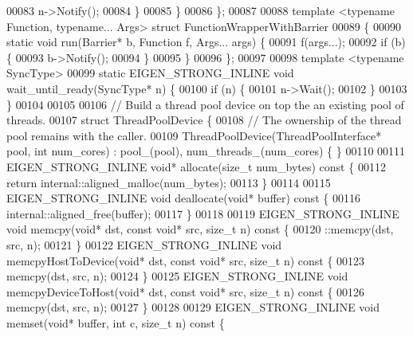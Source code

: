 \begin{DoxyCode}
00083       n->Notify();
00084     \}
00085   \}
00086 \};
00087 
00088 \textcolor{keyword}{template} <\textcolor{keyword}{typename} Function, \textcolor{keyword}{typename}... Args> \textcolor{keyword}{struct }FunctionWrapperWithBarrier
00089 \{
00090   \textcolor{keyword}{static} \textcolor{keywordtype}{void} run(Barrier* b, Function f, Args... args) \{
00091     f(args...);
00092     \textcolor{keywordflow}{if} (b) \{
00093       b->Notify();
00094     \}
00095   \}
00096 \};
00097 
00098 \textcolor{keyword}{template} <\textcolor{keyword}{typename} SyncType>
00099 \textcolor{keyword}{static} EIGEN\_STRONG\_INLINE \textcolor{keywordtype}{void} wait\_until\_ready(SyncType* n) \{
00100   \textcolor{keywordflow}{if} (n) \{
00101     n->Wait();
00102   \}
00103 \}
00104 
00105 
00106 \textcolor{comment}{// Build a thread pool device on top the an existing pool of threads.}
00107 \textcolor{keyword}{struct }ThreadPoolDevice \{
00108   \textcolor{comment}{// The ownership of the thread pool remains with the caller.}
00109   ThreadPoolDevice(ThreadPoolInterface* pool, \textcolor{keywordtype}{int} num\_cores) : pool\_(pool), num\_threads\_(num\_cores) \{ \}
00110 
00111   EIGEN\_STRONG\_INLINE \textcolor{keywordtype}{void}* allocate(\textcolor{keywordtype}{size\_t} num\_bytes)\textcolor{keyword}{ const }\{
00112     \textcolor{keywordflow}{return} internal::aligned\_malloc(num\_bytes);
00113   \}
00114 
00115   EIGEN\_STRONG\_INLINE \textcolor{keywordtype}{void} deallocate(\textcolor{keywordtype}{void}* buffer)\textcolor{keyword}{ const }\{
00116     internal::aligned\_free(buffer);
00117   \}
00118 
00119   EIGEN\_STRONG\_INLINE \textcolor{keywordtype}{void} memcpy(\textcolor{keywordtype}{void}* dst, \textcolor{keyword}{const} \textcolor{keywordtype}{void}* src, \textcolor{keywordtype}{size\_t} n)\textcolor{keyword}{ const }\{
00120     ::memcpy(dst, src, n);
00121   \}
00122   EIGEN\_STRONG\_INLINE \textcolor{keywordtype}{void} memcpyHostToDevice(\textcolor{keywordtype}{void}* dst, \textcolor{keyword}{const} \textcolor{keywordtype}{void}* src, \textcolor{keywordtype}{size\_t} n)\textcolor{keyword}{ const }\{
00123     memcpy(dst, src, n);
00124   \}
00125   EIGEN\_STRONG\_INLINE \textcolor{keywordtype}{void} memcpyDeviceToHost(\textcolor{keywordtype}{void}* dst, \textcolor{keyword}{const} \textcolor{keywordtype}{void}* src, \textcolor{keywordtype}{size\_t} n)\textcolor{keyword}{ const }\{
00126     memcpy(dst, src, n);
00127   \}
00128 
00129   EIGEN\_STRONG\_INLINE \textcolor{keywordtype}{void} memset(\textcolor{keywordtype}{void}* buffer, \textcolor{keywordtype}{int} c, \textcolor{keywordtype}{size\_t} n)\textcolor{keyword}{ const }\{

\end{DoxyCode}
